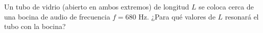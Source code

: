 \item Un tubo de vidrio (abierto en ambos extremos) de longitud $L$ se coloca cerca de una bocina de audio de frecuencia $f = 680\text{ Hz}$. ¿Para qué valores de $L$ resonará el tubo con la bocina?